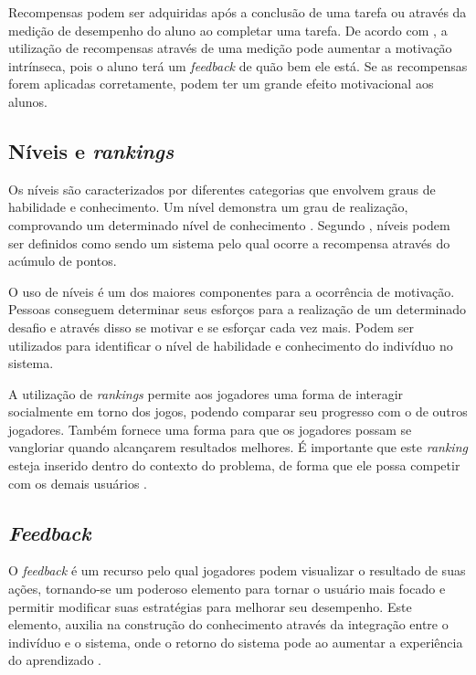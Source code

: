 \documentclass[
	12pt,				%
	oneside,			%
	a4paper,			%
	english,			%
	french,				%
	spanish,			%
	brazil,				%
	]{abntex2}
\begin{document}
Recompensas podem ser adquiridas após a conclusão de uma tarefa ou através da medição de desempenho do aluno ao completar uma tarefa. De acordo com \citet{quadros2016gamificaccao}, a utilização de recompensas através de uma medição pode aumentar a motivação intrínseca, pois o aluno terá um \textit{feedback} de quão bem ele está. Se as recompensas forem aplicadas corretamente, podem ter um grande efeito motivacional aos alunos.
    
\subsection{Níveis e \textit{rankings}}        

Os níveis são caracterizados por diferentes categorias que envolvem graus de habilidade e conhecimento. Um nível demonstra um grau de realização, comprovando um determinado nível de conhecimento \cite{kaap:2014}. Segundo \citet{quadros2016gamificaccao}, níveis podem ser definidos como sendo um sistema pelo qual ocorre a recompensa através do acúmulo de pontos.

O uso de níveis é um dos maiores componentes para a ocorrência de motivação. Pessoas conseguem determinar seus esforços para a realização de um determinado desafio e através disso se motivar e se esforçar cada vez mais. Podem ser utilizados para identificar o nível de habilidade e conhecimento do indivíduo no sistema.

A utilização de \textit{rankings} permite aos jogadores uma forma de interagir socialmente em torno dos jogos, podendo comparar seu progresso com o de outros jogadores. Também fornece uma forma para que os jogadores possam se vangloriar quando alcançarem resultados melhores. É importante que este \textit{ranking} esteja inserido dentro do contexto do problema, de forma que ele possa competir com os demais usuários \cite{quadros2016gamificaccao}.
    
\subsection{\textit{Feedback}}            

O \textit{feedback} é um recurso pelo qual jogadores podem visualizar o resultado de suas ações, tornando-se um poderoso elemento para tornar o usuário mais focado e permitir modificar suas estratégias para melhorar seu desempenho. Este elemento, auxilia na construção do conhecimento através da integração entre o indivíduo e o sistema, onde o retorno do sistema pode ao aumentar a experiência do aprendizado \cite{fardo2013gamificaccao}.
    
\end{document}
